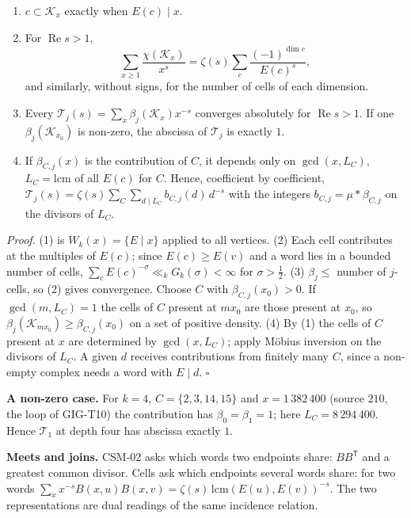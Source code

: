 \documentclass[
  11pt,
]{article}
\providecommand{\tightlist}{%
  \setlength{\itemsep}{0pt}\setlength{\parskip}{0pt}}
\begin{document}
\begin{enumerate}
\def\labelenumi{\arabic{enumi}.}
\tightlist
\item
  \(c\subset\mathcal K_x\) exactly when \(E(c)\mid x\).
\item
  For \(\operatorname{Re}s>1\),
  \[\sum_{x\ge1}\frac{\chi(\mathcal K_x)}{x^s}=\zeta(s)\sum_c\frac{(-1)^{\dim c}}{E(c)^s},\]
  and similarly, without signs, for the number of cells of each
  dimension.
\item
  Every \(\mathcal T_j(s)=\sum_x\beta_j(\mathcal K_x)x^{-s}\) converges
  absolutely for \(\operatorname{Re}s>1\). If one
  \(\beta_j(\mathcal K_{x_0})\) is non-zero, the abscissa of
  \(\mathcal T_j\) is exactly \(1\).
\item
  If \(\beta_{C,j}(x)\) is the contribution of \(C\), it depends only on
  \(\gcd(x,L_C)\), \(L_C=\mathrm{lcm}\) of all \(E(c)\) for \(C\).
  Hence, coefficient by coefficient,
  \(\mathcal T_j(s)=\zeta(s)\sum_C\sum_{d\mid L_C}b_{C,j}(d)\,d^{-s}\)
  with the integers \(b_{C,j}=\mu*\beta_{C,j}\) on the divisors of
  \(L_C\).
\end{enumerate}

\emph{Proof.} (1) is \(W_k(x)=\{E\mid x\}\) applied to all vertices. (2)
Each cell contributes at the multiples of \(E(c)\); since
\(E(c)\ge E(v)\) and a word lies in a bounded number of cells,
\(\sum_cE(c)^{-\sigma}\ll_kG_k(\sigma)<\infty\) for \(\sigma>\frac12\).
(3) \(\beta_j\le\) number of \(j\)-cells, so (2) gives convergence.
Choose \(C\) with \(\beta_{C,j}(x_0)>0\). If \(\gcd(m,L_C)=1\) the cells
of \(C\) present at \(mx_0\) are those present at \(x_0\), so
\(\beta_j(\mathcal K_{mx_0})\ge\beta_{C,j}(x_0)\) on a set of positive
density. (4) By (1) the cells of \(C\) present at \(x\) are determined
by \(\gcd(x,L_C)\); apply Möbius inversion on the divisors of \(L_C\). A
given \(d\) receives contributions from finitely many \(C\), since a
non-empty complex needs a word with \(E\mid d\). \(\square\)

\textbf{A non-zero case.} For \(k=4\), \(C=\{2,3,14,15\}\) and
\(x=1\,382\,400\) (source \(210\), the loop of GIG-T10) the contribution
has \(\beta_0=\beta_1=1\); here \(L_C=8\,294\,400\). Hence
\(\mathcal T_1\) at depth four has abscissa exactly \(1\).

\textbf{Meets and joins.} CSM-02 asks which words two endpoints share:
\(B B^{\mathsf T}\) and a greatest common divisor. Cells ask which
endpoints several words share: for two words
\(\sum_xx^{-s}B(x,u)B(x,v)=\zeta(s)\,\mathrm{lcm}(E(u),E(v))^{-s}\). The
two representations are dual readings of the same incidence relation.
\end{document}
